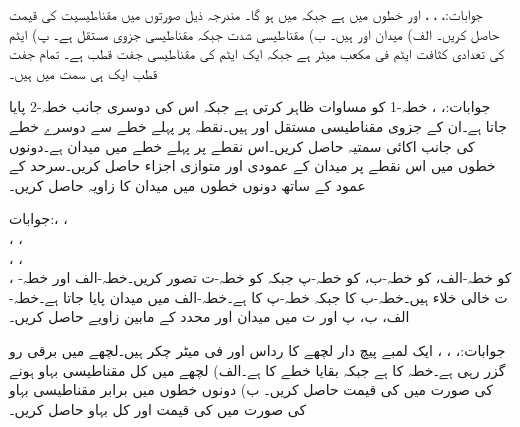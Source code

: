 جوابات:، ، ،  اور  خطوں میں  ہے جبکہ  میں  ہو گا۔
مندرجہ ذیل صورتوں میں مقناطیسیت  کی قیمت  حاصل کریں۔ الف) میدان  اور  ہیں۔ ب) مقناطیسی 
شدت  جبکہ مقناطیسی جزوی مستقل  ہے۔ پ) ایٹم کی تعدادی کثافت  ایٹم فی مکعب میٹر ہے جبکہ ایک ایٹم کی مقناطیسی جفت قطب  ہے۔ تمام جفت قطب ایک ہی سمت میں ہیں۔

جوابات:، ، 
خطہ-1 کو مساوات  ظاہر کرتی ہے جبکہ اس کی دوسری جانب خطہ-2 پایا جاتا ہے۔ان کے جزوی مقناطیسی مستقل  اور  ہیں۔نقطہ  پر پہلے خطے سے دوسرے خطے کی جانب اکائی سمتیہ حاصل کریں۔اس نقطے پر پہلے خطے میں میدان
  ہے۔دونوں خطوں میں اس نقطے پر میدان کے عمودی اور متوازی اجزاء حاصل کریں۔سرحد کے عمود کے ساتھ دونوں خطوں میں میدان کا زاویہ حاصل کریں۔

جوابات:، ، \\ 
 ، ، \\
 ، ، \\
،  
 کو خطہ-الف،  کو خطہ-ب،  کو خطہ-پ جبکہ  کو خطہ-ت تصور کریں۔خطہ-الف اور خطہ-ت خالی خلاء ہیں۔خطہ-ب کا   جبکہ خطہ-پ کا  ہے۔خطہ-الف میں میدان  پایا جاتا ہے۔خطہ-الف، ب، پ اور ت میں میدان اور  محدد کے مابین زاویے حاصل کریں۔

جوابات:، ، ، 
ایک لمبے پیچ دار لچھے کا رداس  اور فی میٹر چکر  ہیں۔لچھے میں  برقی رو گزر رہی ہے۔خطہ  کا  ہے جبکہ بقایا خطے  کا  ہے۔الف) لچھے میں کل مقناطیسی بہاو  ہونے کی صورت میں  کی قیمت حاصل کریں۔ ب) دونوں خطوں میں برابر مقناطیسی بہاو کی صورت میں  کی قیمت اور کل بہاو حاصل کریں۔ 

